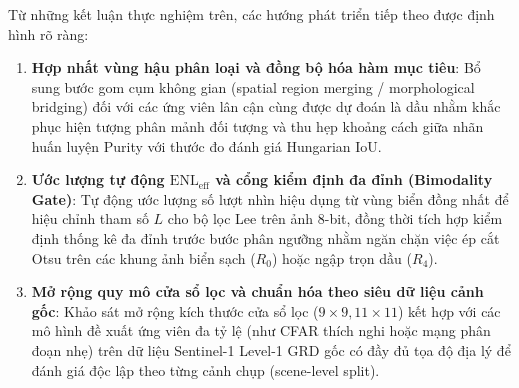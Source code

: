 Từ những kết luận thực nghiệm trên, các hướng phát triển tiếp theo được định hình rõ ràng:
\begin{enumerate}
    \item \textbf{Hợp nhất vùng hậu phân loại và đồng bộ hóa hàm mục tiêu}: Bổ sung bước gom cụm không gian (spatial region merging / morphological bridging) đối với các ứng viên lân cận cùng được dự đoán là dầu nhằm khắc phục hiện tượng phân mảnh đối tượng và thu hẹp khoảng cách giữa nhãn huấn luyện Purity với thước đo đánh giá Hungarian IoU.
    \item \textbf{Ước lượng tự động $\text{ENL}_{\text{eff}}$ và cổng kiểm định đa đỉnh (Bimodality Gate)}: Tự động ước lượng số lượt nhìn hiệu dụng từ vùng biển đồng nhất để hiệu chỉnh tham số $L$ cho bộ lọc Lee trên ảnh 8-bit, đồng thời tích hợp kiểm định thống kê đa đỉnh trước bước phân ngưỡng nhằm ngăn chặn việc ép cắt Otsu trên các khung ảnh biển sạch ($R_0$) hoặc ngập trọn dầu ($R_4$).
    \item \textbf{Mở rộng quy mô cửa sổ lọc và chuẩn hóa theo siêu dữ liệu cảnh gốc}: Khảo sát mở rộng kích thước cửa sổ lọc ($9 \times 9, 11 \times 11$) kết hợp với các mô hình đề xuất ứng viên đa tỷ lệ (như CFAR thích nghi hoặc mạng phân đoạn nhẹ) trên dữ liệu Sentinel-1 Level-1 GRD gốc có đầy đủ tọa độ địa lý để đánh giá độc lập theo từng cảnh chụp (scene-level split).
\end{enumerate}
